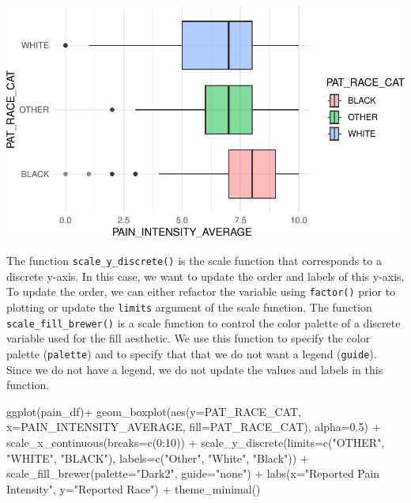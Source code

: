 \documentclass[
  letterpaper,
]{krantz}
\makeatletter
\newenvironment{Shaded}{\begin{snugshade}}{\end{snugshade}}
\newcommand{\AttributeTok}[1]{\textcolor[rgb]{0.40,0.45,0.13}{#1}}
\newcommand{\DecValTok}[1]{\textcolor[rgb]{0.68,0.00,0.00}{#1}}
\newcommand{\FloatTok}[1]{\textcolor[rgb]{0.68,0.00,0.00}{#1}}
\newcommand{\FunctionTok}[1]{\textcolor[rgb]{0.28,0.35,0.67}{#1}}
\newcommand{\NormalTok}[1]{\textcolor[rgb]{0.00,0.23,0.31}{#1}}
\newcommand{\SpecialCharTok}[1]{\textcolor[rgb]{0.37,0.37,0.37}{#1}}
\newcommand{\StringTok}[1]{\textcolor[rgb]{0.13,0.47,0.30}{#1}}
\newenvironment{kframe}{%
\medskip{}
\setlength{\fboxsep}{.8em}
 \def\at@end@of@kframe{}%
 \ifinner\ifhmode%
  \def\at@end@of@kframe{\end{minipage}}%
  \begin{minipage}{\columnwidth}%
 \fi\fi%
 \def\FrameCommand##1{\hskip\@totalleftmargin \hskip-\fboxsep
 \colorbox{shadecolor}{##1}\hskip-\fboxsep
     \hskip-\linewidth \hskip-\@totalleftmargin \hskip\columnwidth}%
 \MakeFramed {\advance\hsize-\width
   \@totalleftmargin\z@ \linewidth\hsize
   \@setminipage}}%
 {\par\unskip\endMakeFramed%
 \at@end@of@kframe}
\renewenvironment{Shaded}{\begin{kframe}}{\end{kframe}}
\makeatother
\begin{document}
\begin{center}
\includegraphics[width=1\textwidth,height=\textheight]{book/visualization_ggplot_files/figure-pdf/unnamed-chunk-12-1.pdf}
\end{center}

The function \texttt{scale\_y\_discrete()} is the scale function that
corresponds to a discrete y-axis. In this case, we want to update the
order and labels of this y-axis. To update the order, we can either
refactor the variable using \texttt{factor()} prior to plotting or
update the \texttt{limits} argument of the scale function. The function
\texttt{scale\_fill\_brewer()} is a scale function to control the color
palette of a discrete variable used for the fill aesthetic. We use this
function to specify the color palette (\texttt{palette}) and to specify
that that we do not want a legend (\texttt{guide}). Since we do not have
a legend, we do not update the values and labels in this function.

\begin{Shaded}
\begin{Highlighting}[]
\FunctionTok{ggplot}\NormalTok{(pain\_df)}\SpecialCharTok{+}
  \FunctionTok{geom\_boxplot}\NormalTok{(}\FunctionTok{aes}\NormalTok{(}\AttributeTok{y=}\NormalTok{PAT\_RACE\_CAT, }\AttributeTok{x=}\NormalTok{PAIN\_INTENSITY\_AVERAGE, }
                   \AttributeTok{fill=}\NormalTok{PAT\_RACE\_CAT), }\AttributeTok{alpha=}\FloatTok{0.5}\NormalTok{) }\SpecialCharTok{+}
  \FunctionTok{scale\_x\_continuous}\NormalTok{(}\AttributeTok{breaks=}\FunctionTok{c}\NormalTok{(}\DecValTok{0}\SpecialCharTok{:}\DecValTok{10}\NormalTok{)) }\SpecialCharTok{+}
  \FunctionTok{scale\_y\_discrete}\NormalTok{(}\AttributeTok{limits=}\FunctionTok{c}\NormalTok{(}\StringTok{"OTHER"}\NormalTok{, }\StringTok{"WHITE"}\NormalTok{, }\StringTok{"BLACK"}\NormalTok{), }
                   \AttributeTok{labels=}\FunctionTok{c}\NormalTok{(}\StringTok{"Other"}\NormalTok{, }\StringTok{"White"}\NormalTok{, }\StringTok{"Black"}\NormalTok{)) }\SpecialCharTok{+}
  \FunctionTok{scale\_fill\_brewer}\NormalTok{(}\AttributeTok{palette=}\StringTok{"Dark2"}\NormalTok{, }\AttributeTok{guide=}\StringTok{"none"}\NormalTok{) }\SpecialCharTok{+}
  \FunctionTok{labs}\NormalTok{(}\AttributeTok{x=}\StringTok{"Reported Pain Intensity"}\NormalTok{, }\AttributeTok{y=}\StringTok{"Reported Race"}\NormalTok{) }\SpecialCharTok{+}
  \FunctionTok{theme\_minimal}\NormalTok{()}
\end{Highlighting}
\end{Shaded}
\end{document}
